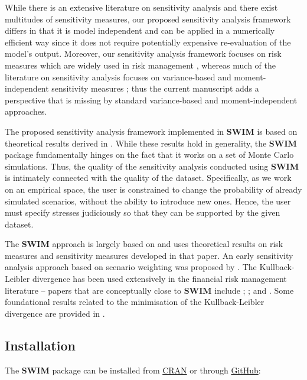 \documentclass[
]{article}
\begin{document}
While there is an extensive literature on sensitivity analysis and there exist multitudes of sensitivity measures, our proposed sensitivity analysis framework differs in that it is model independent and can be applied in a numerically efficient way since it does not require potentially expensive re-evaluation of the model's output. Moreover, our sensitivity analysis framework focuses on risk measures which are widely used in risk management \citep{Mcneil2015B}, whereas much of the literature on sensitivity analysis focuses on variance-based and moment-independent sensitivity measures \citep{borgonovo2016common}; thus the current manuscript adds a perspective that is missing by standard variance-based and moment-independent approaches.

The proposed sensitivity analysis framework implemented in \textbf{SWIM} is based on theoretical results derived in \citet{Pesenti2019}. While these results hold in generality, the \textbf{SWIM} package fundamentally hinges on the fact that it works on a set of Monte Carlo simulations. Thus, the quality of the sensitivity analysis conducted using \textbf{SWIM} is intimately connected with the quality of the dataset. Specifically, as we work on an empirical space, the user is constrained to change the probability of already simulated scenarios, without the ability to introduce new ones. Hence, the user must specify stresses judiciously so that they can be supported by the given dataset.

The \textbf{SWIM} approach is largely based on \citet{Pesenti2019} and uses theoretical results on risk measures and sensitivity measures developed in that paper. An early sensitivity analysis approach based on scenario weighting was proposed by \citet{Beckman1987}. The Kullback-Leibler divergence has been used extensively in the financial risk management literature -- papers that are conceptually close to \textbf{SWIM} include \citet{Weber2007}; \citet{Breuer2013}; and \citet{Cambou2017}. Some foundational results related to the minimisation of the Kullback-Leibler divergence are provided in \citet{Csiszar1975dAP}.

\hypertarget{installation}{%
\subsection{Installation}\label{installation}}

The \textbf{SWIM} package can be installed from \href{https://CRAN.R-project.org/package=SWIM}{CRAN} or through \href{https://github.com/spesenti/SWIM}{GitHub}:
\end{document}
